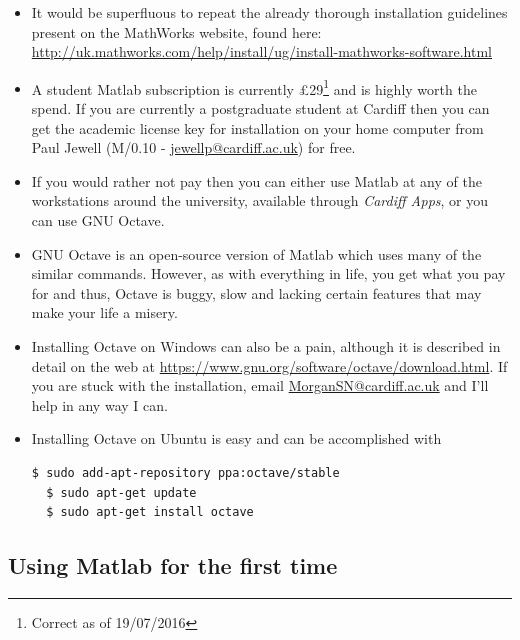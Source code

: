 \documentclass[12pt]{report}
\begin{document}
\begin{itemize}
\item It would be superfluous to repeat the already thorough installation guidelines present on the MathWorks website, found here: \\
\small \url{http://uk.mathworks.com/help/install/ug/install-mathworks-software.html}
\normalsize
\item A student Matlab subscription is currently £29\footnote{Correct as of 19/07/2016} and is highly worth the spend. If you are currently a postgraduate student at Cardiff then you can get the academic license key for installation on your home computer from Paul Jewell (M/0.10 - \url{jewellp@cardiff.ac.uk}) for free.
\item If you would rather not pay then you can either use Matlab at any of the workstations around the university, available through \textit{Cardiff Apps}, or you can use GNU Octave.
\item GNU Octave is an open-source version of Matlab which uses many of the similar commands. However, as with everything in life, you get what you pay for and thus, Octave is buggy, slow and lacking certain features that may make your life a misery.
\item Installing Octave on Windows can also be a pain, although it is described in detail on the web at \url{https://www.gnu.org/software/octave/download.html}. If you are stuck with the installation, email \url{MorganSN@cardiff.ac.uk} and I'll help in any way I can.
\item Installing Octave on Ubuntu is easy and can be accomplished with
\begin{lstlisting}[language=bash]
  $ sudo add-apt-repository ppa:octave/stable
  $ sudo apt-get update
  $ sudo apt-get install octave
\end{lstlisting}
\end{itemize}

\subsection*{Using Matlab for the first time}
\end{document}
